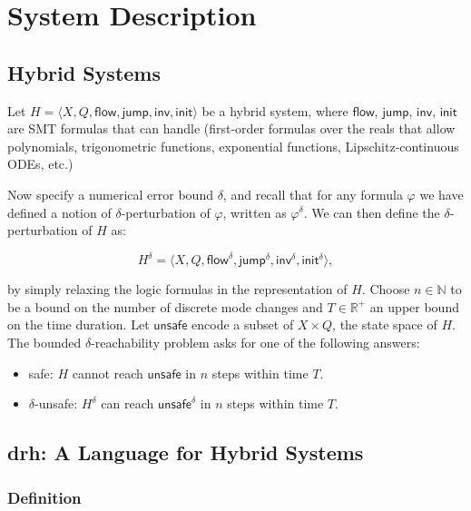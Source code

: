 \section{System Description}


\subsection{Hybrid Systems}

Let $H = \langle X, Q, \mathsf{flow}, \mathsf{jump},
\mathsf{inv},\mathsf{init}\rangle$ be a hybrid system, where
$\mathsf{flow}$, $\mathsf{jump}$, $\mathsf{inv}$, $\mathsf{init}$ are
SMT formulas that \dReal{} can handle (first-order formulas over
the reals that allow polynomials, trigonometric functions, exponential
functions, Lipschitz-continuous ODEs, etc.)

Now specify a numerical error bound $\delta$, and recall that for any
formula $\varphi$ we have defined a notion of $\delta$-perturbation of
$\varphi$, written as $\varphi^{\delta}$. We can then define the
$\delta$-perturbation of $H$ as:

\[
H^{\delta} = \langle X, Q, {\mathsf{flow}}^{\delta},
{\mathsf{jump}}^{\delta}, {\mathsf{inv}}^{\delta},
{\mathsf{init}}^{\delta}\rangle,
\]

by simply relaxing the logic formulas in the representation of $H$.
Choose $n\in\mathbb{N}$ to be a bound on the number of discrete mode
changes and $T\in \mathbb{R}^+$ an upper bound on the time duration.
Let $\mathsf{unsafe}$ encode a subset of $X\times Q$, the state space
of $H$. The bounded $\delta$-reachability problem asks for one of the
following answers:

\begin{itemize}
\item  safe: $H$ cannot reach $\mathsf{unsafe}$ in $n$ steps within
  time $T$.
\item $\delta$-unsafe: $H^{\delta}$ can reach ${\mathsf{unsafe}}^{\delta}$ in $n$ steps within time $T$.
\end{itemize}

\subsection{drh: A Language for Hybrid Systems}

\subsubsection{Definition}

